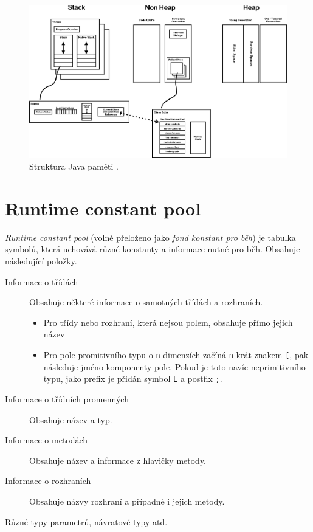 \begin{figure}[h]
	\centering
	\includegraphics[scale=0.1]{obrazky/JVM_Internal_Architecture.png}
	\caption{Struktura Java paměti \cite{jvms-img}.}
	\label{obr-jvms-img}
\end{figure}

\section{Runtime constant pool}
\textit{Runtime constant pool} (volně přeloženo jako \textit{fond konstant pro běh}) je tabulka symbolů, která uchovává různé konstanty a informace nutné pro běh. Obsahuje následující položky.

\begin{description}
    \item[Informace o třídách] Obsahuje některé informace o samotných třídách a rozhraních.
        \begin{itemize}
            \item Pro třídy nebo rozhraní, která nejsou polem, obsahuje přímo jejich název
            \item Pro pole promitivního typu o \texttt{n} dimenzích začíná \texttt{n}-krát znakem \texttt{[}, pak následuje jméno komponenty pole. Pokud je toto navíc neprimitivního typu, jako prefix je přidán symbol \texttt{L} a postfix \texttt{;}.
        \end{itemize}
    \item[Informace o třídních promenných] Obsahuje název a typ.
    \item[Informace o metodách] Obsahuje název a informace z hlavičky metody.
    \item[Informace o rozhraních] Obsahuje názvy rozhraní a případně i jejich metody.   
    \item[Různé typy parametrů, návratové typy atd.]  
\end{description}

